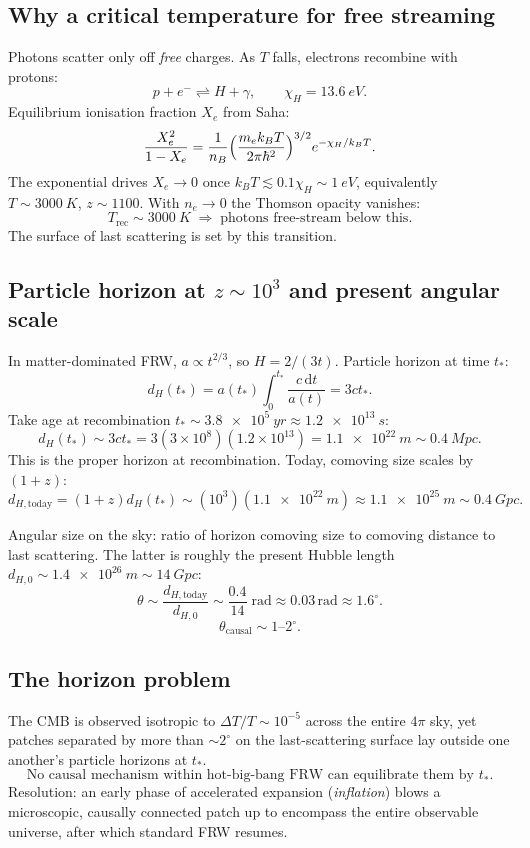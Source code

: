 \documentclass[11pt]{article}
\newcommand{\de}{\mathrm{d}}
\begin{document}
\subsection*{Why a critical temperature for free streaming}

Photons scatter only off \emph{free} charges. As $T$ falls, electrons recombine with protons:
\[ p + e^{-} \rightleftharpoons H + \gamma,\qquad \chi_{H}=\SI{13.6}{eV}. \]
Equilibrium ionisation fraction $X_{e}$ from Saha:
\[ \frac{X_{e}^{2}}{1-X_{e}} = \frac{1}{n_{B}}\Bigl(\frac{m_{e}k_{B}T}{2\pi\hbar^{2}}\Bigr)^{3/2}e^{-\chi_{H}/k_{B}T}. \]
The exponential drives $X_{e}\to 0$ once $k_{B}T\lesssim 0.1\chi_{H}\sim\SI{1}{eV}$, equivalently $T\sim \SI{3000}{K}$, $z\sim 1100$. With $n_{e}\to 0$ the Thomson opacity vanishes:
\[ \boxed{\;T_{\text{rec}}\sim \SI{3000}{K}\;\Rightarrow\;\text{photons free-stream below this}.\;} \]
The surface of last scattering is set by this transition.

\subsection*{Particle horizon at $z\sim 10^{3}$ and present angular scale}

In matter-dominated FRW, $a\propto t^{2/3}$, so $H=2/(3t)$. Particle horizon at time $t_{*}$:
\[ d_{H}(t_{*}) = a(t_{*})\!\int_{0}^{t_{*}}\!\frac{c\,\de t}{a(t)} = 3 c t_{*}. \]
Take age at recombination $t_{*}\sim \SI{3.8e5}{yr}\approx \SI{1.2e13}{s}$:
\[ d_{H}(t_{*}) \sim 3 c t_{*} = 3(3\times 10^{8})(1.2\times 10^{13}) = \SI{1.1e22}{m}\sim \SI{0.4}{Mpc}. \]
This is the proper horizon at recombination. Today, comoving size scales by $(1+z)$:
\[ d_{H,\text{today}} = (1+z)d_{H}(t_{*}) \sim (10^{3})(\SI{1.1e22}{m})\approx \SI{1.1e25}{m}\sim \SI{0.4}{Gpc}. \]

Angular size on the sky: ratio of horizon comoving size to comoving distance to last scattering. The latter is roughly the present Hubble length $d_{H,0}\sim \SI{1.4e26}{m}\sim \SI{14}{Gpc}$:
\[ \theta \sim \frac{d_{H,\text{today}}}{d_{H,0}} \sim \frac{0.4}{14}\;\text{rad}\approx 0.03\,\text{rad}\approx 1.6^{\circ}. \]
\[ \boxed{\;\theta_{\text{causal}} \sim 1\text{--}2^{\circ}.\;} \]

\subsection*{The horizon problem}

The CMB is observed isotropic to $\Delta T/T\sim 10^{-5}$ across the entire $4\pi$ sky, yet patches separated by more than $\sim 2^{\circ}$ on the last-scattering surface lay outside one another's particle horizons at $t_{*}$.
\[ \boxed{\;\text{No causal mechanism within hot-big-bang FRW can equilibrate them by }t_{*}.\;} \]
Resolution: an early phase of accelerated expansion (\emph{inflation}) blows a microscopic, causally connected patch up to encompass the entire observable universe, after which standard FRW resumes.
\end{document}
